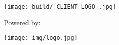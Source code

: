\texttt{[image: build/\_CLIENT\_LOGO\_.jpg]}

\vspace{100px}

\centerline{Powered by:}
\texttt{[image: img/logo.jpg]}
\newpage
